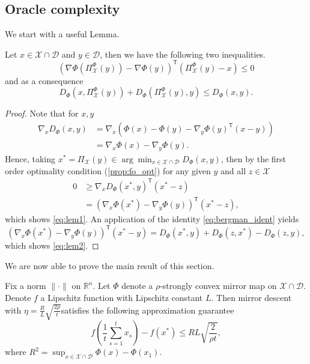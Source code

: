 \subsection{Oracle complexity}
\label{subsec:complexity}
We start with a useful Lemma.
\begin{lemma}
Let $x \in \mathcal{X}\cap \mathcal{D}$ and $y\in \mathcal{D}$, then we have the following two inequalities.
\begin{equation}\label{eq:lem1}
	\left(\nabla\Phi\left(\Pi_\mathcal{X}^\Phi(y) \right)- \nabla \Phi(y)\right)^\mathsf{T}\left(\Pi_\mathcal{X}^\Phi(y) - x \right) \leq 0
\end{equation}
and as a consequence
\begin{equation}\label{eq:lem2}
	D_\Phi(x, \Pi_\mathcal{X}^\Phi(y)) + D_\Phi(\Pi_\mathcal{X}^\Phi(y), y) \leq D_\Phi(x, y).
\end{equation}
\end{lemma}
\begin{proof}
Note that for $x, y$
\begin{align*}
	\nabla_x D_\Phi(x, y) &= \nabla_x \left(\Phi(x) - \Phi(y) - \nabla_y\Phi(y)^\mathsf{T}(x - y) \right)	\\
	&=	\nabla_x \Phi(x) - \nabla_y \Phi(y).
\end{align*}
Hence, taking $x^* = \Pi_\mathcal{X}(y) \in \arg \min_{x\in \mathcal{X}\cap\mathcal{D}} D_\Phi(x, y) $, then by the first order optimality condition (\autoref{prop:fo_opt}) for any given $y$ and all $z \in \mathcal{X}$
\begin{align*}
	0 & \geq \nabla_x D_\Phi(x^*, y)^\mathsf{T}(x^* - z) \\
	  & = \left(\nabla_x \Phi(x^*) - \nabla_y \Phi(y)\right)^\mathsf{T} (x^* - z),
\end{align*}
which shows \eqref{eq:lem1}. An application of the identity \eqref{eq:bergman_ident} yields 
\begin{equation*}
	\left(\nabla_x \Phi(x^*) - \nabla_y \Phi(y)\right)^\mathsf{T} (x^* - y) = D_\Phi(x^*, y) + D_\Phi(z, x^*) - D_\Phi(z, y),
\end{equation*}
which shows \eqref{eq:lem2}.
\end{proof}

We are now able to prove the main result of this section.
\begin{theorem}\label{compl:mirror_descent}
Fix a norm $\|\cdot \|$ on $\mathbb{R}^n$. Let $\Phi$ denote a $\rho$-strongly convex mirror map on $\mathcal{X}\cap\mathcal{D}$. Denote $f$ a Lipschitz function with Lipschitz constant $L$. Then mirror descent with $\eta =\frac{R}{L}\sqrt{\frac{2\rho}{t}}$satisfies the following approximation guarantee
\begin{equation*}
	f\left(\frac{1}{t}\sum_{s=1}^t x_s \right) - f(x^*) \leq RL\sqrt{\frac{2}{\rho t}},
\end{equation*}
where $R^2 = \sup_{x\in \mathcal{X}\cap\mathcal{D}}\Phi(x)-\Phi(x_1)$.
\end{theorem}

